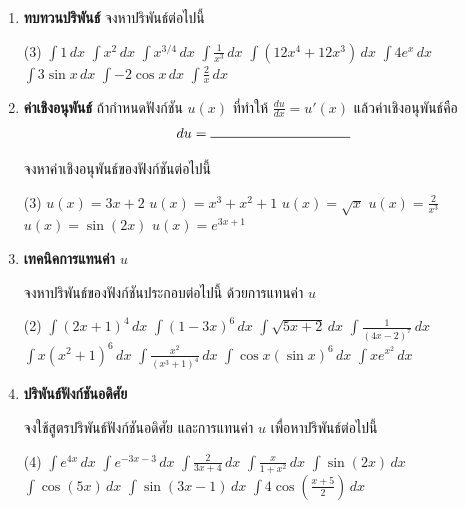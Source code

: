 \begin{enumerate}
\item \textbf{ทบทวนปริพันธ์} จงหาปริพันธ์ต่อไปนี้

\begin{tasks}[after-skip = 80pt, after-item-skip = 80pt](3)
\task $\int 1 \, dx$
\task $\int x^2 \, dx$
\task $\int x^{3/4} \, dx$
\task $\int \frac{1}{x^3} \, dx$
\task $\int (12x^4 + 12x^3) \, dx$
\task $\int 4e^x \,dx$
\task $\int 3\sin x \,dx$
\task $\int -2\cos x \,dx$
\task $\int \frac{2}{x} \,dx$
\end{tasks}

\item \textbf{ค่าเชิงอนุพันธ์} ถ้ากำหนดฟังก์ชัน $u(x)$ ที่ทำให้ $\frac{du}{dx} = u'(x)$ แล้วค่าเชิงอนุพันธ์คือ
\[ du = \rule{100pt}{0.5pt}\]

จงหาค่าเชิงอนุพันธ์ของฟังก์ชันต่อไปนี้

\begin{tasks}[after-skip = 60pt, after-item-skip=60pt](3)
\task $u(x) = 3x+2$
\task $u(x) = x^3+x^2+1$
\task $u(x) = \sqrt{x}$
\task $u(x) = \frac{2}{x^3}$
\task $u(x) = \sin(2x)$
\task $u(x) = e^{3x+1}$
\end{tasks}

\newpage 
\item  \textbf{เทคนิคการแทนค่า $u$}

จงหาปริพันธ์ของฟังก์ชันประกอบต่อไปนี้ ด้วยการแทนค่า $u$
\begin{tasks}[after-skip = 100pt, after-item-skip=100pt](2)
\task $\int (2x+1)^4 \, dx$
\task $\int (1-3x)^6 \, dx$
\task $\int \sqrt{5x+2} \, dx$
\task $\int \frac{1}{(4x-2)^7} \, dx$
\task $\int x(x^2+1)^6 \, dx$
\task $\int \frac{x^2}{(x^3+1)^4} \, dx$
\task $\int \cos x (\sin x)^6 \, dx$
\task $\int xe^{x^2} \, dx$
\end{tasks}

\item \textbf{ปริพันธ์ฟังก์ชันอดิศัย}

จงใช้สูตรปริพันธ์ฟังก์ชันอดิศัย และการแทนค่า $u$ เพื่อหาปริพันธ์ต่อไปนี้

\begin{tasks}[after-skip = 60pt, after-item-skip=60pt](4)
\task $\int e^{4x} \, dx$
\task $\int e^{-3x-3} \, dx$
\task $\int \frac{2}{3x+4} \, dx$
\task $\int \frac{x}{1+x^2} \, dx$
\task $\int \sin (2x) \, dx$
\task $\int \cos (5x) \, dx$
\task $\int \sin (3x-1) \, dx$
\task $\int 4\cos \left( \frac{x+5}{2} \right) \, dx$
\end{tasks}


\end{enumerate}